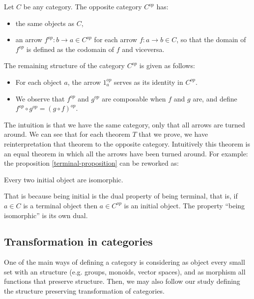 \begin{definition}\cite[Definition 1.2.1]{riehl2017category}
  Let $C$ be any category. The opposite category $C^{op}$ has:
  \begin{itemize}
  \item the same objects as $C$,
  \item an arrow $f^{op}:b \to a\in C^{op}$ for each arrow $f: a\to b \in C$, so that the domain of $f^{op}$ is defined as the codomain of $f$ and viceversa.
  \end{itemize}
  The remaining structure of the category $C^{op}$ is given as follows:
  \begin{itemize}
  \item For each object $a$, the arrow $1_a^{op}$ serves as its identity in $C^{op}$.
  \item We observe that $f^{op}$ and $g^{op}$ are composable when $f$ and $g$ are, and define $f^{op} \circ g^{op} = (g \circ f)^{op}$.
  \end{itemize}
\end{definition}


The intuition is that we have the same category, only that all arrows are turned around. We can see that  for each theorem $T$ that we prove, we have reinterpretation that theorem to the opposite category. Intuitively this theorem is an equal theorem in which all the arrows have been turned around. For example: the proposition
\ref{terminal-proposition} can be reworked as:

\begin{proposition}\label{prop:initial}
  Every two initial object are isomorphic.
\end{proposition}


That is because being initial is the dual property of being terminal, that is, if $a\in C$ is a terminal object then $a\in C^{op}$ is an initial object. The property ``being isomorphic'' is its own dual.

\subsection{Transformation in categories}




One of the main ways of defining a category is considering as object every small set with an structure (e.g. groups, monoids, vector spaces), and as morphism all functions that preserve structure. Then, we may also follow our study defining the structure preserving transformation of categories.

